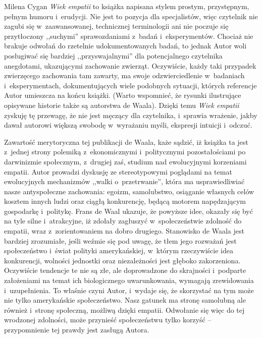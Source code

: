 \begin{recplenv}{Milena Cygan}
\textit{Wiek empatii} to książka napisana stylem prostym, przystępnym, pełnym humoru i~erudycji. Nie jest to pozycja dla
specjalistów, więc czytelnik nie zagubi się w~zaawansowanej, technicznej terminologii ani nie poczuje się przytłoczony
,,suchymi'' sprawozdaniami z~badań i~eksperymentów. Chociaż nie brakuje odwołań do rzetelnie udokumentowanych badań, to
jednak Autor woli posługiwać się bardziej ,,przyswajalnymi'' dla potencjalnego czytelnika anegdotami, ukazującymi
zachowanie zwierząt. Oczywiście, każdy taki przypadek zwierzęcego zachowania tam zawarty, ma swoje
odzwierciedlenie w~badaniach i~eksperymentach, dokumentujących wiele podobnych sytuacji, których referencje Autor umieszcza na końcu
książki. (Warto wspomnieć, że rysunki ilustrujące opisywane historie także są autorstwa de Waala). Dzięki temu
\textit{Wiek empatii} zyskuję tę przewagę, że nie jest męczący dla czytelnika, i~sprawia wrażenie, jakby dawał autorowi
większą swobodę w~wyrażaniu myśli, ekspresji intuicji i~odczuć.

Zawartość merytoryczna tej publikacji de Waala, każe sądzić, iż książka ta jest z~jednej strony
polemiką z~ekonomicznymi i~politycznymi pozostałościami po darwinizmie
społecznym, z~drugiej zaś, studium nad ewolucyjnymi korzeniami empatii.
Autor prowadzi dyskusję ze stereotypowymi poglądami na temat ewolucyjnych mechanizmów ,,walki o~przetrwanie'', która ma
usprawiedliwiać nasze antyspołeczne zachowania: egoizm, samolubstwo, osiąganie własnych celów kosztem innych ludzi oraz
ciągłą konkurencję, będącą motorem napędzającym gospodarkę i~politykę. Frans de Waal ukazuje, że powyższe idee, okazały
się być na tyle silne i~atrakcyjne, iż zdołały zagłuszyć w~społeczeństwie zdolność do empatii, wraz z~zorientowaniem na
dobro drugiego. Stanowisko de Waala jest bardziej zrozumiałe, jeśli weźmie się pod uwagę, że tłem jego rozważań jest
społeczeństwo i~świat polityki amerykańskiej, w~którym rzeczywiście idea konkurencji, wolności jednostki oraz
niezależności jest głęboko zakorzeniona. Oczywiście tendencje te nie są złe, ale doprowadzone do skrajności i~podparte
założeniami na temat ich biologicznego uwarunkowania, wymagają zrewidowania i~uzupełnienia. To właśnie czyni
Autor, i~wydaje się, że skorzystać na tym może nie tylko amerykańskie społeczeństwo. Nasz gatunek ma stronę samolubną ale
również i~stronę społeczną, możliwą dzięki empatii. Odwołanie się więc do tej wrodzonej zdolności, może przynieść
społeczeństwu tylko korzyść -- przypomnienie tej prawdy jest zasługą Autora.


\end{recplenv}
